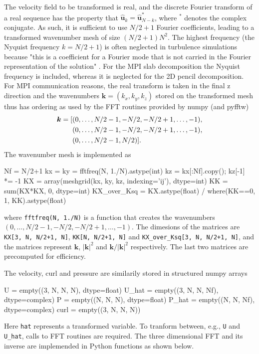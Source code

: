 \documentclass[11pt, oneside]{article}
\newcommand{\inpyth}{\lstinline[style=pythonstyle, basicstyle=\ttfamily]} %[]%
\begin{document}
The velocity field to be transformed is real, and the discrete Fourier transform of a real sequence has the property that $\hat{\bm{u}}_k = \hat{\bm{u}}_{N-k}^*$, where $^*$ denotes the complex conjugate. As such, it is sufficient to use $N/2+1$ Fourier coefficients, leading to a transformed wavenumber mesh of size $(N/2+1)N^2$. The highest frequency (the Nyquist frequency $k=N/2+1$) is often neglected in turbulence simulations because "this is a coefficient for a Fourier mode that is not carried in the
Fourier representation of the solution" \cite{Lee2013}. For the MPI slab decomposition the Nyquist frequency is included, whereas it is neglected for the 2D pencil decomposition. For MPI communication reasons, the real transform is taken in the final z direction and the wavenumbers $\bm{k}=(k_x, k_y, k_z)$ stored on the transformed mesh thus has ordering as used by the FFT routines provided by numpy (and pyfftw)
\begin{align}
  \bm{k} = [&(0, \ldots, N/2-1, -N/2, -N/2+1, \ldots, -1), \notag \\
   &(0, \ldots, N/2-1, -N/2, -N/2+1, \ldots, -1),  \notag \\
  &(0, \ldots, N/2-1, N/2)].
\end{align}
The wavenumber mesh is implemented as
\begin{python}
Nf = N/2+1
kx = ky = fftfreq(N, 1./N).astype(int)
kz = kx[:Nf].copy(); kz[-1] *= -1
KX = array(meshgrid(kx, ky, kz, indexing='ij'), dtype=int)
KK = sum(KX*KX, 0, dtype=int)
KX_over_Ksq = KX.astype(float) / where(KK==0, 1, KK).astype(float)
\end{python}
where \inpyth{fftfreq(N, 1./N)} is a function that creates the wavenumbers $(0, \ldots, N/2-1, -N/2, -N/2+1, \ldots, -1)$. The dimesions of the matrices are \inpyth{KX[3, N, N/2+1, N]}, \inpyth{KK[N, N/2+1, N]} and \inpyth{KX_over_Ksq[3, N, N/2+1, N]}, and the matrices represent $\bm{k}$, $|\bm{k}|^2$ and $\bm{k}/|\bm{k}|^2$ respectively. The last two matrices are precomputed for efficiency.

The velocity, curl and pressure are similarily stored in structured numpy arrays
\begin{python}
U     = empty((3, N, N, N), dtype=float)
U_hat = empty((3, N, N, Nf), dtype=complex)
P     = empty((N, N, N), dtype=float)
P_hat = empty((N, N, Nf), dtype=complex)
curl  = empty((3, N, N, N))
\end{python}
Here \inpyth{hat} represents a transformed variable. To tranform between, e.g., \inpyth{U} and \inpyth{U_hat}, calls to FFT routines are required. The three dimensional FFT and its inverse are implemended in Python functions as shown below.
\end{document}
